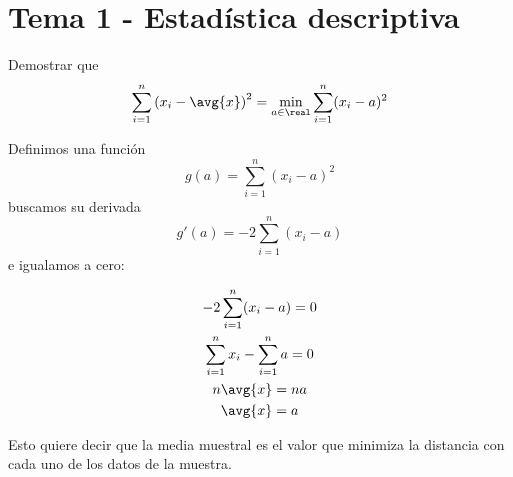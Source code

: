 \section{Tema 1 - Estadística descriptiva}

\begin{problem}[2] Demostrar que \[ \sum_{i=1}^n \left(x_i-\avg{x}\right)^2 = \min_{a\in \real} \sum_{i=1}^n(x_i-a)^2 \]

\solution

Definimos una función \[ g(a) = \sum_{i=1}^n(x_i-a)^2 \] buscamos su derivada \[ g'(a) = -2 \sum_{i=1}^n(x_i-a) \] e igualamos a cero:

\begin{gather*}
-2 \sum_{i=1}^n(x_i-a) = 0 \\
\sum_{i=1}^n x_i - \sum_{i=1}^n a = 0 \\
n \avg{x} = n a \\
\avg{x} = a 
\end{gather*}

Esto quiere decir que la media muestral es el valor que minimiza la distancia con cada uno de los datos de la muestra.
\end{problem}

